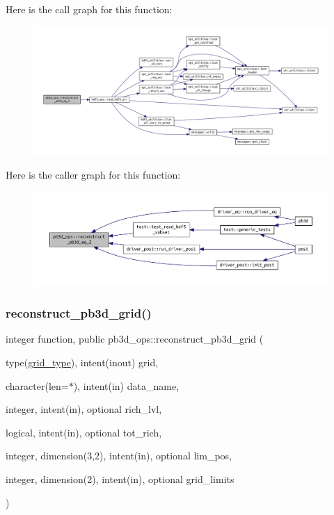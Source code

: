 Here is the call graph for this function\+:\nopagebreak
\begin{figure}[H]
\begin{center}
\leavevmode
\includegraphics[width=350pt]{namespacepb3d__ops_aaf99ae865680f4cf0a0a9932786689bf_cgraph}
\end{center}
\end{figure}
Here is the caller graph for this function\+:\nopagebreak
\begin{figure}[H]
\begin{center}
\leavevmode
\includegraphics[width=350pt]{namespacepb3d__ops_aaf99ae865680f4cf0a0a9932786689bf_icgraph}
\end{center}
\end{figure}
\mbox{\label{namespacepb3d__ops_a4218b582c5029ff05893265fa329877b}} 
\subsubsection{\texorpdfstring{reconstruct\+\_\+pb3d\+\_\+grid()}{reconstruct\_pb3d\_grid()}}
{\footnotesize\ttfamily integer function, public pb3d\+\_\+ops\+::reconstruct\+\_\+pb3d\+\_\+grid (\begin{DoxyParamCaption}\item[{type(\hyperlink{structgrid__vars_1_1grid__type}{grid\+\_\+type}), intent(inout)}]{grid,  }\item[{character(len=$\ast$), intent(in)}]{data\+\_\+name,  }\item[{integer, intent(in), optional}]{rich\+\_\+lvl,  }\item[{logical, intent(in), optional}]{tot\+\_\+rich,  }\item[{integer, dimension(3,2), intent(in), optional}]{lim\+\_\+pos,  }\item[{integer, dimension(2), intent(in), optional}]{grid\+\_\+limits }\end{DoxyParamCaption})}



